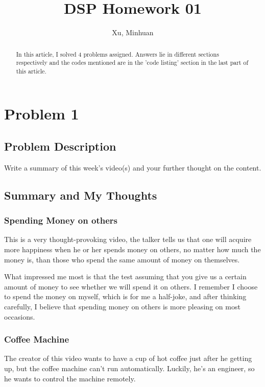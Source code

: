 \documentclass{article}
\begin{document}
\title{DSP Homework 01}
\author{Xu, Minhuan}
\maketitle
\tableofcontents

\begin{abstract}
    In this article, I solved 4 problems assigned. Answers lie in different sections respectively and the codes mentioned are in the 'code listing' section in the last part of this article.
\end{abstract}

\section{Problem 1}
\subsection{Problem Description}

Write a summary of this week’s video(s) and your further thought on the content.

\subsection{Summary and My Thoughts}
\subsubsection{Spending Money on others}

This is a very thought-provoking video, the talker tells us that one will acquire more happiness when he or her spends money on others, no matter how much the money is, than those who spend the same amount of money on themselves.

What impressed me most is that the test assuming that you give us a certain amount of money to see whether we will spend it on others. I remember I choose to spend the money on myself, which is for me a half-joke, and after thinking carefully, I believe that spending money on others is more pleasing on most occasions.

\subsubsection{Coffee Machine}

The creator of this video wants to have a cup of hot coffee just after he getting up, but the coffee machine can't run automatically. Luckily, he's an engineer, so he wants to control the machine remotely.
\end{document}
